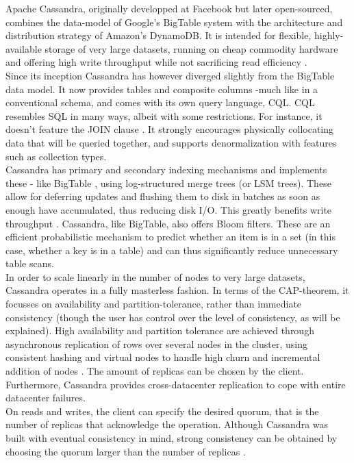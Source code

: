 \documentclass{IEEEtran}
\begin{document}
Apache Cassandra, originally developped at Facebook but later open-sourced, combines the data-model of Google's BigTable system with the architecture and distribution strategy of Amazon's DynamoDB. It is intended for flexible, highly-available storage of very large datasets, running on cheap commodity hardware and offering high write throughput while not sacrificing read efficiency \cite{lakshman2010cassandra}.
\\
Since its inception Cassandra has however diverged slightly from the BigTable data model. It now provides tables and composite columns -much like in a conventional schema, and comes with its own query language, CQL\cite{cassandra_then&now}. CQL resembles SQL in many ways, albeit with some restrictions. For instance, it doesn't feature the JOIN clause \cite{cassandra_cql}. It strongly encourages physically collocating data that will be queried together, and supports denormalization with features such as collection types.\\
Cassandra has primary and secondary indexing mechanisms and implements these - like BigTable \cite{chang2008bigtable}, using log-structured merge trees (or LSM trees). These allow for deferring updates and flushing them to disk in batches as soon as enough have accumulated, thus reducing disk I/O. This greatly benefits write throughput \cite{o1996log}\cite{sears2012blsm}\cite{lakshman2010cassandra}. Cassandra, like BigTable, also offers Bloom filters\cite{mullin1983second}. These are an efficient probabilistic mechanism to predict whether an item is in a set (in this case, whether a key is in a table) and can thus significantly reduce unnecessary table scans\cite{lakshman2010cassandra}.\\
In order to scale linearly in the number of nodes to very large datasets, Cassandra operates in a fully masterless fashion. In terms of the CAP-theorem, it focusses on availability and partition-tolerance, rather than immediate consistency (though the user has control over the level of consistency, as will be explained)\cite{brewer2000towards}. High availability and partition tolerance are achieved through asynchronous replication of rows over several nodes in the cluster, using consistent hashing and virtual nodes to handle high churn and incremental addition of nodes \cite{decandia2007dynamo} \cite{lakshman2010cassandra} \cite{cassandra_then&now}. The amount of replicas can be chosen by the client. Furthermore, Cassandra provides cross-datacenter replication to cope with entire datacenter failures.
\\On reads and writes, the client can specify the desired quorum, that is the number of replicas that acknowledge the operation. Although Cassandra was built with eventual consistency in mind, strong consistency can be obtained by choosing the quorum larger than the number of replicas \cite{grolinger2013data}.\\
\end{document}
